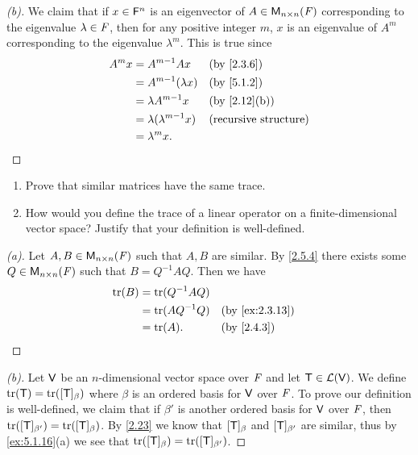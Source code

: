 \begin{proof}[(b)]
  We claim that if \(x \in \mathsf{F}^n\) is an eigenvector of \(A \in \ms[n][n][\F]\) corresponding to the eigenvalue \(\lambda \in \mathit{F}\), then for any positive integer \(m\), \(x\) is an eigenvalue of \(A^m\) corresponding to the eigenvalue \(\lambda^m\).
  This is true since
  \begin{align*}
    A^m x & = A^{m - 1} Ax                &  & \by{2.3.6}                   \\
          & = A^{m - 1}(\lambda x)        &  & \by{5.1.2}                   \\
          & = \lambda A^{m - 1} x         &  & \by{2.12}[b]                 \\
          & = \lambda (\lambda^{m - 1} x) &  & \text{(recursive structure)} \\
          & = \lambda^m x.
  \end{align*}
\end{proof}

\begin{ex}\label{ex:5.1.16}
  \begin{enumerate}
    \item Prove that similar matrices have the same trace.
    \item How would you define the trace of a linear operator on a finite-dimensional vector space?
          Justify that your definition is well-defined.
  \end{enumerate}
\end{ex}

\begin{proof}[(a)]
  Let \(A, B \in \ms[n][n][\F]\) such that \(A, B\) are similar.
  By \cref{2.5.4} there exists some \(Q \in \ms[n][n][\F]\) such that \(B = Q^{-1} A Q\).
  Then we have
  \begin{align*}
    \tr(B) & = \tr(Q^{-1} A Q)                     \\
           & = \tr(A Q^{-1} Q) &  & \by{ex:2.3.13} \\
           & = \tr(A).         &  & \by{2.4.3}
  \end{align*}
\end{proof}

\begin{proof}[(b)]
  Let \(\mathsf{V}\) be an \(n\)-dimensional vector space over \(\mathit{F}\) and let \(\mathsf{T} \in \mathcal{L}(\mathsf{V})\).
  We define \(\tr(\T) = \tr([\T]_{\beta})\) where \(\beta\) is an ordered basis for \(\mathsf{V}\) over \(\mathit{F}\).
  To prove our definition is well-defined, we claim that if \(\beta'\) is another ordered basis for \(\mathsf{V}\) over \(\mathit{F}\), then \(\tr([\T]_{\beta'}) = \tr([\T]_{\beta})\).
  By \cref{2.23} we know that \([\mathsf{T}]_{\beta}\) and \([\mathsf{T}]_{\beta'}\) are similar, thus by \cref{ex:5.1.16}(a) we see that \(\tr([\T]_{\beta}) = \tr([\T]_{\beta'})\).
\end{proof}

